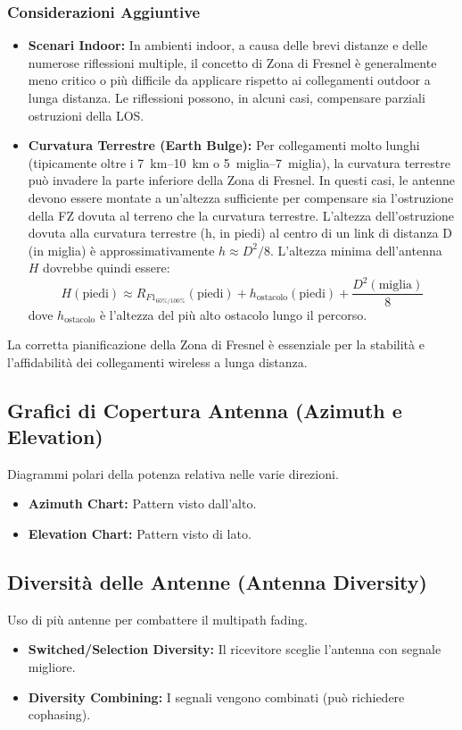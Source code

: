 \subsubsection{Considerazioni Aggiuntive}
\begin{itemize}
    \item \textbf{Scenari Indoor:} In ambienti indoor, a causa delle brevi distanze e delle numerose riflessioni multiple, il concetto di Zona di Fresnel è generalmente meno critico o più difficile da applicare rispetto ai collegamenti outdoor a lunga distanza. Le riflessioni possono, in alcuni casi, compensare parziali ostruzioni della LOS.
    \item \textbf{Curvatura Terrestre (Earth Bulge):} Per collegamenti molto lunghi (tipicamente oltre i \SIrange{7}{10}{\kilo\meter} o \SIrange{5}{7}{miglia}), la curvatura terrestre può invadere la parte inferiore della Zona di Fresnel. In questi casi, le antenne devono essere montate a un'altezza sufficiente per compensare sia l'ostruzione della FZ dovuta al terreno che la curvatura terrestre. L'altezza dell'ostruzione dovuta alla curvatura terrestre (h, in piedi) al centro di un link di distanza D (in miglia) è approssimativamente $h \approx D^2/8$. L'altezza minima dell'antenna $H$ dovrebbe quindi essere:
    \[ H (\text{piedi}) \approx R_{F1_{\text{60\%/100\%}}} (\text{piedi}) + h_{\text{ostacolo}} (\text{piedi}) + \frac{D^2 (\text{miglia})}{8} \]
    dove $h_{\text{ostacolo}}$ è l'altezza del più alto ostacolo lungo il percorso.
\end{itemize}

La corretta pianificazione della Zona di Fresnel è essenziale per la stabilità e l'affidabilità dei collegamenti wireless a lunga distanza.

\subsection{Grafici di Copertura Antenna (Azimuth e Elevation)}
Diagrammi polari della potenza relativa nelle varie direzioni.
\begin{itemize}
    \item \textbf{Azimuth Chart:} Pattern visto dall'alto.
    \item \textbf{Elevation Chart:} Pattern visto di lato.
\end{itemize}

\subsection{Diversità delle Antenne (Antenna Diversity)}
Uso di più antenne per combattere il multipath fading.
\begin{itemize}
    \item \textbf{Switched/Selection Diversity:} Il ricevitore sceglie l'antenna con segnale migliore.
    \item \textbf{Diversity Combining:} I segnali vengono combinati (può richiedere cophasing).
\end{itemize}

